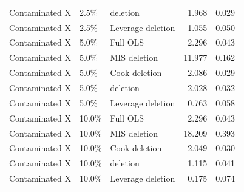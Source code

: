 \begin{table}[htbp]
{\begin{tabular}{@{}lllrr@{}}
Contaminated X & 2.5\% & \dfbetas{} deletion & 1.968 & 0.029 \\
Contaminated X & 2.5\% & Leverage deletion & 1.055 & 0.050 \\
\addlinespace
Contaminated X & 5.0\% & Full OLS & 2.296 & 0.043 \\
Contaminated X & 5.0\% & MIS deletion & 11.977 & 0.162 \\
Contaminated X & 5.0\% & Cook deletion & 2.086 & 0.029 \\
Contaminated X & 5.0\% & \dfbetas{} deletion & 2.028 & 0.032 \\
Contaminated X & 5.0\% & Leverage deletion & 0.763 & 0.058 \\
\addlinespace
Contaminated X & 10.0\% & Full OLS & 2.296 & 0.043 \\
Contaminated X & 10.0\% & MIS deletion & 18.209 & 0.393 \\
Contaminated X & 10.0\% & Cook deletion & 2.049 & 0.030 \\
Contaminated X & 10.0\% & \dfbetas{} deletion & 1.115 & 0.041 \\
Contaminated X & 10.0\% & Leverage deletion & 0.175 & 0.074 \\
\bottomrule
\end{tabular}%
}
\end{table}
